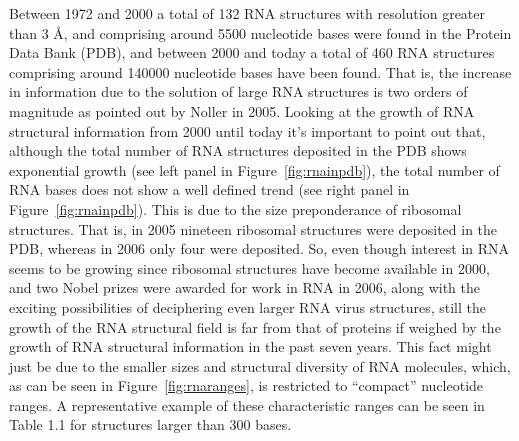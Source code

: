 \noindent Between  1972 and  2000 a total  of 132 RNA  structures with
resolution greater  than 3 \AA, and comprising  around 5500 nucleotide
bases were found  in the Protein Data Bank (PDB),  and between 2000 and
today  a  total of  460  RNA  structures comprising  around
140000  nucleotide   bases  have been  found.  That  is,   the  increase  in
information  due to  the solution of large RNA  structures  is two orders  of
magnitude as pointed out  by Noller \cite{noller2005} in 2005. Looking
at the growth of RNA structural information from 2000 until today it's
important  to  point  out  that,  although the  total  number  of  RNA
structures  deposited in the  PDB shows  exponential growth  (see left
panel in  Figure~\ref{fig:rnainpdb}), the total number  of RNA bases 
does not show a well defined trend (see right panel in
Figure~\ref{fig:rnainpdb}). 
This is due to the
size preponderance of ribosomal  structures. That is, in 2005 nineteen
ribosomal structures were  deposited in the PDB, whereas  in 2006 only
four  were deposited.  So, even  though interest  in RNA  seems  to be
growing  since  ribosomal structures  have become  available  in 2000,  and
two Nobel  prizes were awarded for work in  RNA in 2006, along
with  the  exciting  possibilities  of  deciphering  even  larger  RNA
virus structures, still the  growth of the RNA structural
field is  far from that  of proteins if  weighed by the growth  of RNA
structural information in  the past seven years. This  fact might just
be due to the smaller  sizes and structural diversity of RNA molecules,
which,  as can  be seen  in Figure~\ref{fig:rnaranges}, is  restricted  to
``compact'' nucleotide ranges.
A representative example of these  characteristic ranges can be seen in
Table 1.1 for structures larger than 300 bases.

